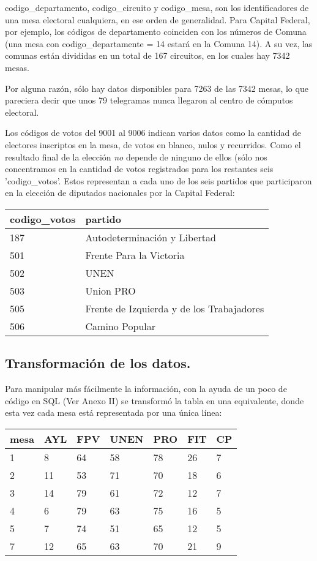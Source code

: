 \documentclass[12pt, a4paper]{article}
\begin{document}
codigo\_departamento, codigo\_circuito y codigo\_mesa, son los identificadores de una mesa electoral cualquiera, en ese orden de generalidad. Para Capital Federal, por ejemplo, los c\'odigos de departamento coinciden con los n\'umeros de Comuna (una mesa con codigo\_departamente = 14 estar\'a en la Comuna 14). A su vez, las comunas est\'an divididas en un total de 167 circuitos, en los cuales hay 7342 mesas.

Por alguna raz\'on, s\'olo hay datos disponibles para 7263 de las 7342 mesas, lo que pareciera decir que unos 79 telegramas nunca llegaron al centro de c\'omputos electoral.

Los c\'odigos de votos del 9001 al 9006 indican varios datos como la cantidad de electores inscriptos en la mesa, de votos en blanco, nulos y recurridos. Como el resultado final de la elecci\'on \emph{no} depende de ninguno de ellos (s\'olo nos concentramos en la cantidad de votos registrados para los restantes seis 'codigo\_votos'. Estos representan a cada uno de los seis partidos que participaron en la elecci\'on de diputados nacionales por la Capital Federal:

\begin{center}
	\begin{tabular}{ll}
		codigo\_votos & partido \\ \hline
		   187 & Autodeterminaci\'on y Libertad\\
		   501 & Frente Para la Victoria \\
		   502 & UNEN \\
		   503 & Union PRO \\
		   505 & Frente de Izquierda y de los Trabajadores \\
		   506 & Camino Popular \\
	\end{tabular}
\end{center}
 
\subsection{Transformaci\'on de los datos.}

Para manipular m\'as f\'acilmente la informaci\'on, con la ayuda de un poco de c\'odigo en SQL (Ver Anexo II) se transform\'o la tabla en una equivalente, donde esta vez cada mesa est\'a representada por una \'unica l\'inea:

\begin{center}
	\begin{tabular}{l | llllll}
mesa & AYL & FPV & UNEN & PRO & FIT & CP \\ \hline
1 & 8 & 64 & 58 & 78 & 26 & 7 \\
2 & 11 & 53 & 71 & 70 & 18 & 6 \\
3 & 14 & 79 & 61 & 72 & 12 & 7 \\
4 & 6 & 79 & 63 & 75 & 16 & 5 \\
5 & 7 & 74 & 51 & 65 & 12 & 5 \\
7 & 12 & 65 & 63 & 70 & 21 & 9 \\
	\end{tabular}
\end{center}
\end{document}
